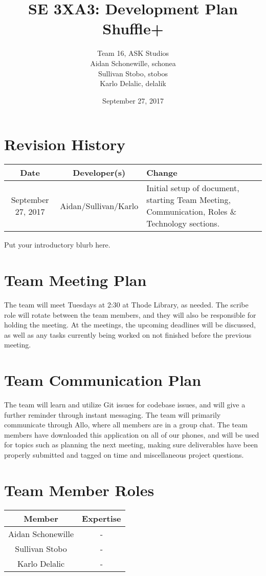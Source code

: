 \documentclass{article}
\title{SE 3XA3: Development Plan\\Shuffle+}
\author{Team 16, ASK Studios
		\\ Aidan Schonewille, schonea
		\\ Sullivan Stobo, stobos
		\\ Karlo Delalic, delalik
}
\date{September 27, 2017}
\begin{document}
\section*{Revision History}
\begin{center}
\begin{tabular}{| c | c | p{6cm} |}
\hline
\textbf{Date} & \textbf{Developer(s)} & \textbf{Change}\\
\hline
September 27, 2017 & Aidan/Sullivan/Karlo & Initial setup of document, starting Team Meeting, Communication, Roles \& Technology sections.\\
\hline
\end{tabular}
\end{center}

\newpage

\maketitle

\newpage

Put your introductory blurb here.

\section{Team Meeting Plan}
The team will meet Tuesdays at 2:30 at Thode Library, as needed.  The scribe role will rotate between the team members, and they will also be responsible for holding the meeting.  At the meetings, the upcoming deadlines will be discussed, as well as any tasks currently being worked on not finished before the previous meeting.

\section{Team Communication Plan}
The team will learn and utilize Git issues for codebase issues, and will give a further reminder through instant messaging.  The team will primarily communicate through Allo, where all members are in a group chat.  The team members have downloaded this application on all of our phones, and will be used for topics such as planning the next meeting, making sure deliverables have been properly submitted and tagged on time and miscellaneous project questions.

\section{Team Member Roles}
\begin{tabular}{|c|c|}
\hline
Member&Expertise\\
\hline
Aidan Schonewille&-\\
Sullivan Stobo&-\\
Karlo Delalic&-\\
\hline
\end{tabular}
\end{document}
